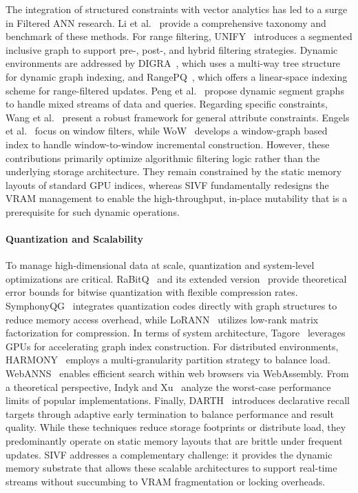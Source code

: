 \documentclass[sigconf,nonacm]{acmart}
\theoremstyle{plain}
\theoremstyle{definition}
\theoremstyle{remark}
\begin{document}
The integration of structured constraints with vector analytics has led to a surge in Filtered ANN research. Li et al.~\cite{10.1145/3769763} provide a comprehensive taxonomy and benchmark of these methods. 
For range filtering, UNIFY~\cite{10.14778/3717755.3717770} introduces a segmented inclusive graph to support pre-, post-, and hybrid filtering strategies. 
Dynamic environments are addressed by DIGRA~\cite{10.1145/3725399}, which uses a multi-way tree structure for dynamic graph indexing, and RangePQ~\cite{10.1145/3725401}, which offers a linear-space indexing scheme for range-filtered updates. 
Peng et al.~\cite{10.14778/3748191.3748193} propose dynamic segment graphs to handle mixed streams of data and queries.
Regarding specific constraints, Wang et al.~\cite{DBLP:conf/nips/WangLX0YN23} present a robust framework for general attribute constraints. 
Engels et al.~\cite{engels2024approximate} focus on window filters, while WoW~\cite{10.1145/3769843} develops a window-graph based index to handle window-to-window incremental construction.
However, these contributions primarily optimize algorithmic filtering logic rather than the underlying storage architecture. They remain constrained by the static memory layouts of standard GPU indices, whereas SIVF fundamentally redesigns the VRAM management to enable the high-throughput, in-place mutability that is a prerequisite for such dynamic operations.

\paragraph{Quantization and Scalability}

To manage high-dimensional data at scale, quantization and system-level optimizations are critical. 
RaBitQ~\cite{10.1145/3654970} and its extended version~\cite{10.1145/3725413} provide theoretical error bounds for bitwise quantization with flexible compression rates. 
SymphonyQG~\cite{10.1145/3709730} integrates quantization codes directly with graph structures to reduce memory access overhead, while LoRANN~\cite{DBLP:conf/nips/JaasaariHR24} utilizes low-rank matrix factorization for compression.
In terms of system architecture, Tagore~\cite{10.1145/3769825} leverages GPUs for accelerating graph index construction. 
For distributed environments, HARMONY~\cite{10.1145/3749167} employs a multi-granularity partition strategy to balance load. 
WebANNS~\cite{10.1145/3726302.3730115} enables efficient search within web browsers via WebAssembly. 
From a theoretical perspective, Indyk and Xu~\cite{DBLP:conf/nips/IndykX23} analyze the worst-case performance limits of popular implementations. 
Finally, DARTH~\cite{10.1145/3749160} introduces declarative recall targets through adaptive early termination to balance performance and result quality.
While these techniques reduce storage footprints or distribute load, they predominantly operate on static memory layouts that are brittle under frequent updates. SIVF addresses a complementary challenge: it provides the dynamic memory substrate that allows these scalable architectures to support real-time streams without succumbing to VRAM fragmentation or locking overheads.
\end{document}
